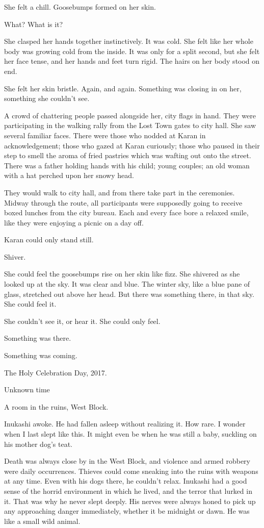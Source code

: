 She felt a chill. Goosebumps formed on her skin.

What? What is it?

She clasped her hands together instinctively. It was cold. She felt like
her whole body was growing cold from the inside. It was only for a split
second, but she felt her face tense, and her hands and feet turn rigid.
The hairs on her body stood on end.

She felt her skin bristle. Again, and again. Something was closing in on
her, something she couldn't see.

A crowd of chattering people passed alongside her, city flags in hand.
They were participating in the walking rally from the Lost Town gates to
city hall. She saw several familiar faces. There were those who nodded
at Karan in acknowledgement; those who gazed at Karan curiously; those
who paused in their step to smell the aroma of fried pastries which was
wafting out onto the street. There was a father holding hands with his
child; young couples; an old woman with a hat perched upon her snowy
head.

They would walk to city hall, and from there take part in the
ceremonies. Midway through the route, all participants were supposedly
going to receive boxed lunches from the city bureau. Each and every face
bore a relaxed smile, like they were enjoying a picnic on a day off.

Karan could only stand still.

Shiver.

She could feel the goosebumps rise on her skin like fizz. She shivered
as she looked up at the sky. It was clear and blue. The winter sky, like
a blue pane of glass, stretched out above her head. But there was
something there, in that sky. She could feel it.

She couldn't see it, or hear it. She could only feel.

Something was there.

Something was coming.

The Holy Celebration Day, 2017.

Unknown time

A room in the ruins, West Block.

Inukashi awoke. He had fallen asleep without realizing it. How rare. I
wonder when I last slept like this. It might even be when he was still a
baby, suckling on his mother dog's teat.

Death was always close by in the West Block, and violence and armed
robbery were daily occurrences. Thieves could come sneaking into the
ruins with weapons at any time. Even with his dogs there, he couldn't
relax. Inukashi had a good sense of the horrid environment in which he
lived, and the terror that lurked in it. That was why he never slept
deeply. His nerves were always honed to pick up any approaching danger
immediately, whether it be midnight or dawn. He was like a small wild
animal.

